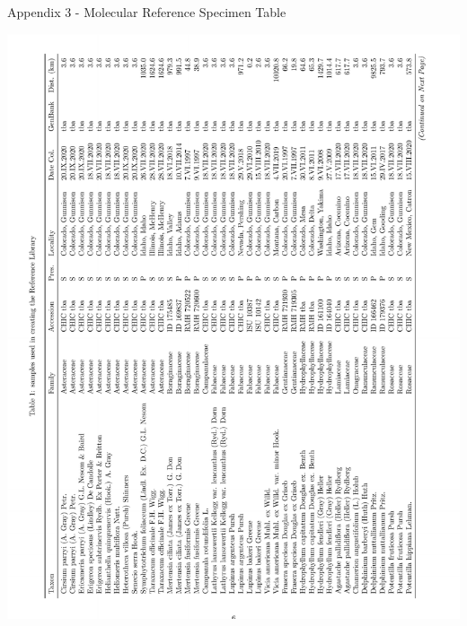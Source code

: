 \documentclass[
]{article}
\begin{document}
\newpage

Appendix 3 - Molecular Reference Specimen Table

\includegraphics{../graphics/tables/specimen_tables-1.pdf}

\newpage
\end{document}
